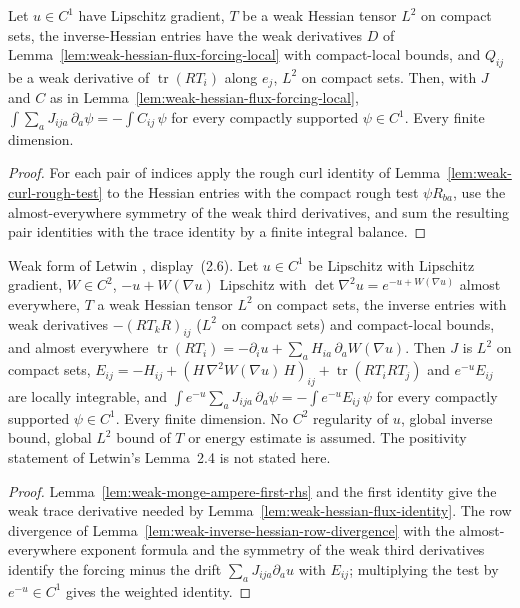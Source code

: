\begin{lemma}
  \label{lem:weak-hessian-flux-identity}
  \leanok
  Let $u\in C^1$ have Lipschitz gradient, $T$ be a weak Hessian tensor $L^2$ on compact sets, the inverse-Hessian entries have the weak
  derivatives $D$ of Lemma~\ref{lem:weak-hessian-flux-forcing-local} with compact-local bounds, and $Q_{ij}$ be a weak derivative of
  $\operatorname{tr}(RT_i)$ along $e_j$, $L^2$ on compact sets. Then, with $J$ and $C$ as in
  Lemma~\ref{lem:weak-hessian-flux-forcing-local}, $\int\sum_aJ_{ija}\,\partial_a\psi=-\int C_{ij}\,\psi$ for every compactly
  supported $\psi\in C^1$. Every finite dimension.
\end{lemma}
\begin{proof}
  \leanok
  For each pair of indices apply the rough curl identity of Lemma~\ref{lem:weak-curl-rough-test} to the Hessian entries with the
  compact rough test $\psi R_{ba}$, use the almost-everywhere symmetry of the weak third derivatives, and sum the resulting pair
  identities with the trace identity by a finite integral balance.
\end{proof}

\begin{lemma}
  \label{lem:letwin-weak-hessian-evolution}
  \leanok
  Weak form of Letwin \cite{Letwin2026QuadraticKLS}, display~(2.6). Let $u\in C^1$ be Lipschitz with Lipschitz gradient, $W\in C^2$,
  $-u+W(\nabla u)$ Lipschitz with $\det\nabla^2u=e^{-u+W(\nabla u)}$ almost everywhere, $T$ a weak Hessian tensor $L^2$ on compact
  sets, the inverse entries with weak derivatives $-(RT_kR)_{ij}$ ($L^2$ on compact sets) and compact-local bounds, and almost
  everywhere $\operatorname{tr}(RT_i)=-\partial_iu+\sum_aH_{ia}\,\partial_aW(\nabla u)$. Then $J$ is $L^2$ on compact sets,
  $E_{ij}=-H_{ij}+(H\,\nabla^2W(\nabla u)\,H)_{ij}+\operatorname{tr}(RT_iRT_j)$ and $e^{-u}E_{ij}$ are locally integrable, and
  $\int e^{-u}\sum_aJ_{ija}\,\partial_a\psi=-\int e^{-u}E_{ij}\,\psi$ for every compactly supported $\psi\in C^1$. Every finite
  dimension. No $C^2$ regularity of $u$, global inverse bound, global $L^2$ bound of $T$ or energy estimate is assumed. The
  positivity statement of Letwin's Lemma~2.4 is not stated here.
\end{lemma}
\begin{proof}
  \leanok
  Lemma~\ref{lem:weak-monge-ampere-first-rhs} and the first identity give the weak trace derivative needed by
  Lemma~\ref{lem:weak-hessian-flux-identity}. The row divergence of Lemma~\ref{lem:weak-inverse-hessian-row-divergence} with the
  almost-everywhere exponent formula and the symmetry of the weak third derivatives identify the forcing minus the drift
  $\sum_aJ_{ija}\partial_au$ with $E_{ij}$; multiplying the test by $e^{-u}\in C^1$ gives the weighted identity.
\end{proof}

